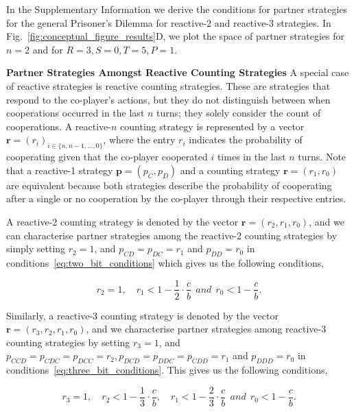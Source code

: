 \documentclass[11pt]{article}
\begin{document}
In the Supplementary Information we derive the conditions for partner strategies
for the general Prisoner's Dilemma for reactive-2 and reactive-3 strategies. In
Fig.~\ref{fig:conceptual_figure_results}D, we plot the space of partner
strategies for $n=2$ and for $R =3, S=0, T=5, P=1$.

\textbf{Partner Strategies Amongst Reactive Counting Strategies}
A special case of reactive strategies is reactive counting strategies. These are
strategies that respond to the co-player's actions, but they do not distinguish
between when cooperations occurred in the last $n$ turns; they solely consider
the count of cooperations. A reactive-$n$ counting strategy is represented by a
vector $\mathbf{r}=(r_i)_{i \in \{n, n -1, \dots, 0\}}$, where the entry \(r_i\)
indicates the probability of cooperating given that the co-player cooperated
\(i\) times in the last \(n\) turns. Note that a reactive-1 strategy
$\mathbf{p}=(p_{C}, p_{D})$ and a counting strategy $\mathbf{r}=(r_1, r_0)$ are
equivalent because both strategies describe the probability of cooperating after
a single or no cooperation by the co-player through their respective entries. 

A reactive-2 counting strategy is denoted by the vector $\mathbf{r}=(r_2,
r_1, r_0)$, and we can characterise partner strategies among the reactive-2
counting strategies by simply setting $r_2 = 1$, and $p_{CD} = p_{DC} = r_1$ and
$p_{DD} = r_0$ in conditions~\eqref{eq:two_bit_conditions} which gives us the
following conditions,

\begin{equation}\label{eq:counting_two_bit_conditions}
  r_2 = 1, \quad \displaystyle r_1 < 1-\frac{1}{2} \cdot \frac{c}{b} ~~and~~ r_0 < 1\!-\! \frac{c}{b}.
\end{equation}

Similarly, a reactive-3 counting strategy is denoted by the vector
$\mathbf{r}=(r_3, r_2, r_1, r_0)$, and we characterise partner strategies among
reactive-3 counting strategies by setting $r_3 = 1$, and $p_{CCD} = p_{CDC} =
p_{DCC} = r_2, p_{DCD} = p_{DDC} = p_{CDD} = r_1$ and $p_{DDD} = r_0$ in
conditions~\eqref{eq:three_bit_conditions}. This gives us the following
conditions,

\begin{equation}\label{eq:counting_three_bit_conditions}
  r_3 = 1, \quad \displaystyle r_2 < 1- \frac{1}{3} \cdot \frac{c}{b}, \quad r_1 < 1- \frac{2}{3} \cdot \frac{c}{b} ~~and~~ r_0 < 1\!-\! \frac{c}{b}.
\end{equation}
\end{document}
